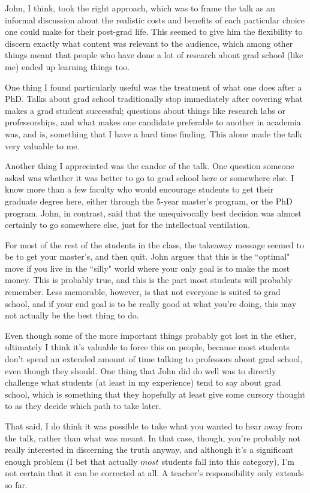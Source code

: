 \documentclass[a4paper]{article}
\begin{document}
John, I think, took the right approach, which was to frame the talk as an informal discussion about the realistic costs and benefits of each particular choice one could make for their post-grad life. This seemed to give him the flexibility to discern exactly what content was relevant to the audience, which among other things meant that people who have done a lot of research about grad school (like me) ended up learning things too.

One thing I found particularly useful was the treatment of what one does after a PhD. Talks about grad school traditionally stop immediately after covering what makes a grad student successful; questions about things like research labs or professorships, and what makes one candidate preferable to another in academia was, and is, something that I have a hard time finding. This alone made the talk very valuable to me.

Another thing I appreciated was the candor of the talk. One question someone asked was whether it was better to go to grad school here or somewhere else. I know more than a few faculty who would encourage students to get their graduate degree here, either through the 5-year master's program, or the PhD program. John, in contrast, said that the unequivocally best decision was almost certainly to go somewhere else, just for the intellectual ventilation.

For most of the rest of the students in the class, the takeaway message seemed to be to get your master's, and then quit. John argues that this is the ``optimal" move if you live in the ``silly" world where your only goal is to make the most money. This is probably true, and this is the part most students will probably remember. Less memorable, however, is that not everyone is suited to grad school, and if your end goal is to be really good at what you're doing, this may not actually be the best thing to do.

Even though some of the more important things probably got lost in the ether, ultimately I think it's valuable to force this on people, because most students don't spend an extended amount of time talking to professors about grad school, even though they should. One thing that John did do well was to directly challenge what students (at least in my experience) tend to say about grad school, which is something that they hopefully at least give some cursory thought to as they decide which path to take later.

That said, I do think it was possible to take what you wanted to hear away from the talk, rather than what was meant. In that case, though, you're probably not really interested in discerning the truth anyway, and although it's a significant enough problem (I bet that actually $\textit{most}$ students fall into this category), I'm not certain that it can be corrected at all. A teacher's responsibility only extends so far.
\end{document}
